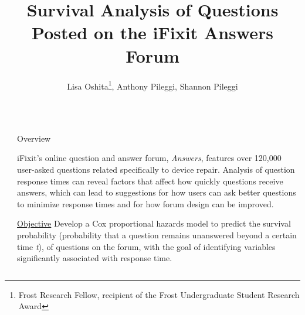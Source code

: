 \documentclass[final]{beamer}
\title{Survival Analysis of Questions Posted on the iFixit Answers Forum} %
\author{Lisa Oshita\footnote{Frost Research Fellow, recipient of the Frost Undergraduate Student Research Award}, Anthony Pileggi, Shannon Pileggi} %
\institute{Department of Statistics, California Polytechnic State University} %
\newlength{\sepwid}
\newlength{\onecolwid}
\begin{document}

\setlength{\belowcaptionskip}{2ex} %
\setlength\belowdisplayshortskip{2ex} %

\begin{frame}[t] %

\begin{columns}[t] %

\begin{column}{\sepwid}\end{column} %

\begin{column}{\onecolwid} %


\begin{alertblock}{Overview}

\textcolor{dblue!70}{} iFixit's online question and answer forum, \textit{Answers}, features over 120,000 user-asked questions related specifically to device repair. Analysis of question response times can reveal factors that affect how quickly questions receive answers, which can lead to suggestions for how users can ask better questions to minimize response times and for how forum design can be improved. 

\textcolor{dblue!70}{} \underline{Objective} Develop a Cox proportional hazards model to predict the survival probability (probability that a question remains unanswered beyond a certain time \textit{t}), of questions on the forum, with the goal of identifying variables significantly associated with response time.

\end{alertblock}



\end{column}
\end{columns}
\end{frame}
\end{document}
